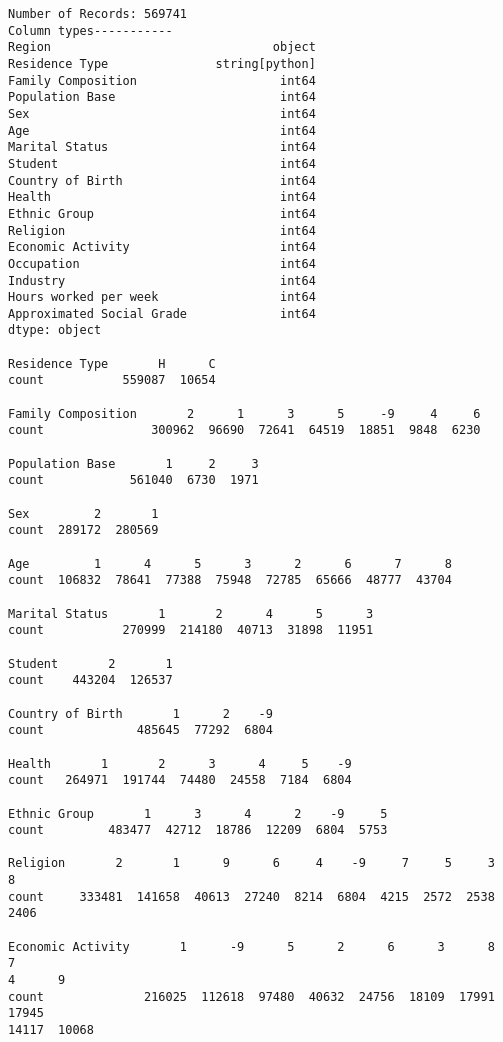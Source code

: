 \documentclass[11pt]{article}
\begin{document}
    \begin{Verbatim}[commandchars=\\\{\}]
Number of Records: 569741
Column types-----------
Region                               object
Residence Type               string[python]
Family Composition                    int64
Population Base                       int64
Sex                                   int64
Age                                   int64
Marital Status                        int64
Student                               int64
Country of Birth                      int64
Health                                int64
Ethnic Group                          int64
Religion                              int64
Economic Activity                     int64
Occupation                            int64
Industry                              int64
Hours worked per week                 int64
Approximated Social Grade             int64
dtype: object

Residence Type       H      C
count           559087  10654

Family Composition       2      1      3      5     -9     4     6
count               300962  96690  72641  64519  18851  9848  6230

Population Base       1     2     3
count            561040  6730  1971

Sex         2       1
count  289172  280569

Age         1      4      5      3      2      6      7      8
count  106832  78641  77388  75948  72785  65666  48777  43704

Marital Status       1       2      4      5      3
count           270999  214180  40713  31898  11951

Student       2       1
count    443204  126537

Country of Birth       1      2    -9
count             485645  77292  6804

Health       1       2      3      4     5    -9
count   264971  191744  74480  24558  7184  6804

Ethnic Group       1      3      4      2    -9     5
count         483477  42712  18786  12209  6804  5753

Religion       2       1      9      6     4    -9     7     5     3     8
count     333481  141658  40613  27240  8214  6804  4215  2572  2538  2406

Economic Activity       1      -9      5      2      6      3      8      7
4      9
count              216025  112618  97480  40632  24756  18109  17991  17945
14117  10068


\end{Verbatim}
\end{document}
